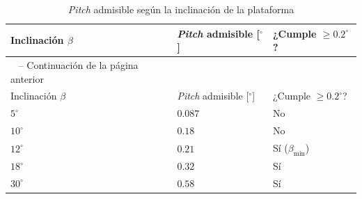 \documentclass[../../General.tex]{subfiles}
\begin{document}
\begin{center}
    \footnotesize
    \begin{xltabular}{0.8\textwidth}{|>{\centering\arraybackslash}X|>{\centering\arraybackslash}X|>{\centering\arraybackslash}X|}
        \caption{\textit{Pitch} admisible según la inclinación de la plataforma\label{tab:pitch_admisible_tilt}} \\
        \hline
        Inclinación $\beta$ & \textit{Pitch} admisible [$^\circ$] & ¿Cumple $\geq 0.2^\circ$? \\ \hline
        \endfirsthead

        {\tablename\ \thetable{} -- Continuación de la página anterior} \\
        \hline
        Inclinación $\beta$ & \textit{Pitch} admisible [$^\circ$] & ¿Cumple $\geq 0.2^\circ$? \\ \hline
        \endhead

        \hline
        \endfoot

        \hline
        \endlastfoot

        $5^\circ$ & $0.087$ & No \\ \hline
        $10^\circ$ & $0.18$ & No \\ \hline
        $12^\circ$ & $0.21$ & Sí ($\beta_{\min}$) \\ \hline
        $18^\circ$ & $0.32$ & Sí \\ \hline
        $30^\circ$ & $0.58$ & Sí \\ \hline
    \end{xltabular}
\end{center}
\end{document}
